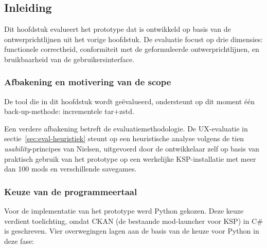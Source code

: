 \chapter{}%
\label{ch:evaluatie-prototype}

\section{Inleiding}
\label{sec:eval-inleiding}

Dit hoofdstuk evalueert het prototype dat is ontwikkeld op basis van de ontwerprichtlijnen uit het vorige hoofdstuk. De evaluatie focust op drie dimensies: functionele correctheid, conformiteit met de geformuleerde ontwerprichtlijnen, en bruikbaarheid van de gebruikersinterface.

\subsection{Afbakening en motivering van de scope}

De tool die in dit hoofdstuk wordt geëvalueerd, ondersteunt op dit moment één back-up-methode: incrementele tar+zstd.

Een verdere afbakening betreft de evaluatiemethodologie. De UX-evaluatie in sectie~\ref{sec:eval-heuristiek} steunt op een heuristische analyse volgens de tien \textit{usability}-principes van Nielsen, uitgevoerd door de ontwikkelaar zelf op basis van praktisch gebruik van het prototype op een werkelijke KSP-installatie met meer dan 100 mods en verschillende savegames.

\subsection{Keuze van de programmeertaal}
\label{subsec:eval-taal}

Voor de implementatie van het prototype werd Python gekozen. Deze keuze verdient toelichting, omdat CKAN (de bestaande mod-launcher voor KSP) in C\# is geschreven. Vier overwegingen lagen aan de basis van de keuze voor Python in deze fase:

